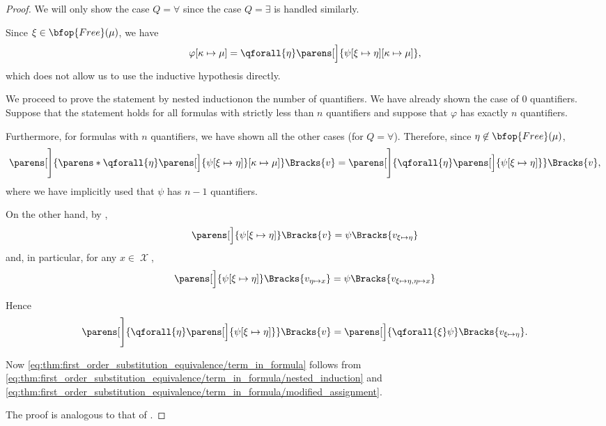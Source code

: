 \begin{proof}
  We will only show the case \( Q = \forall \) since the case \( Q = \exists \) is handled similarly.

  Since \( \xi \in \bfop{Free}(\mu) \), we have
  \begin{equation*}
    \varphi[\kappa \mapsto \mu]
    =
    \qforall{\eta} \parens[\Big]{ \psi[\xi \mapsto \eta][\kappa \mapsto \mu] },
  \end{equation*}
  which does not allow us to use the inductive hypothesis directly.

  We proceed to prove the statement by nested induction\IND on the number of quantifiers. We have already shown the case of \( 0 \) quantifiers. Suppose that the statement holds for all formulas with strictly less than \( n \) quantifiers and suppose that \( \varphi \) has exactly \( n \) quantifiers.

  Furthermore, for formulas with \( n \) quantifiers, we have shown all the other cases (for \( Q = \forall \)). Therefore, since \( \eta \not\in \bfop{Free}(\mu) \),
  \begin{equation}\label{eq:thm:first_order_substitution_equivalence/term_in_formula/nested_induction}
    \parens[\Bigg]{ \parens*{ \qforall{\eta} \parens[\Big]{ \psi[\xi \mapsto \eta] } }[\kappa \mapsto \mu] }\Bracks{v}
    =
    \parens[\Bigg]{\qforall{\eta} \parens[\Big]{ \psi[\xi \mapsto \eta] } }\Bracks{v},
  \end{equation}
  where we have implicitly used that \( \psi \) has \( n - 1 \) quantifiers.

  On the other hand, by ,
  \begin{equation*}
    \parens[\Big]{ \psi[\xi \mapsto \eta] }\Bracks{v} = \psi\Bracks{v_{\xi \mapsto \eta}}
  \end{equation*}
  and, in particular, for any \( x \in \mscrX \),
  \begin{equation*}
    \parens[\Big]{ \psi[\xi \mapsto \eta] }\Bracks{v_{\eta \mapsto x}} = \psi\Bracks{v_{\xi \mapsto \eta,\eta \mapsto x}}
  \end{equation*}

  Hence
  \begin{equation}\label{eq:thm:first_order_substitution_equivalence/term_in_formula/modified_assignment}
    \parens[\Bigg]{\qforall{\eta} \parens[\Big]{ \psi[\xi \mapsto \eta] } }\Bracks{v}
    =
    \parens[\Big]{\qforall{\xi} \psi }\Bracks{v_{\xi \mapsto \eta}}.
  \end{equation}

  Now \eqref{eq:thm:first_order_substitution_equivalence/term_in_formula} follows from \eqref{eq:thm:first_order_substitution_equivalence/term_in_formula/nested_induction} and \eqref{eq:thm:first_order_substitution_equivalence/term_in_formula/modified_assignment}.

   The proof is analogous to that of .
\end{proof}
